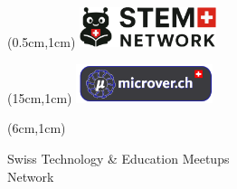 \documentclass[10pt]{article}
\begin{document}
\begin{textblock*}{5cm}(0.5cm,1cm) %
	\includegraphics[width=4cm]{stem-network.png}
\end{textblock*}

\begin{textblock*}{5cm}(15cm,1cm) %
	\includegraphics[width=4cm]{microver.png}
\end{textblock*}

\begin{textblock*}{8cm}(6cm,1cm) %
	\begin{center}
		Swiss Technology \& Education Meetups \\
		Network
	\end{center}
\end{textblock*}

\vspace*{0.3cm}
\end{document}
